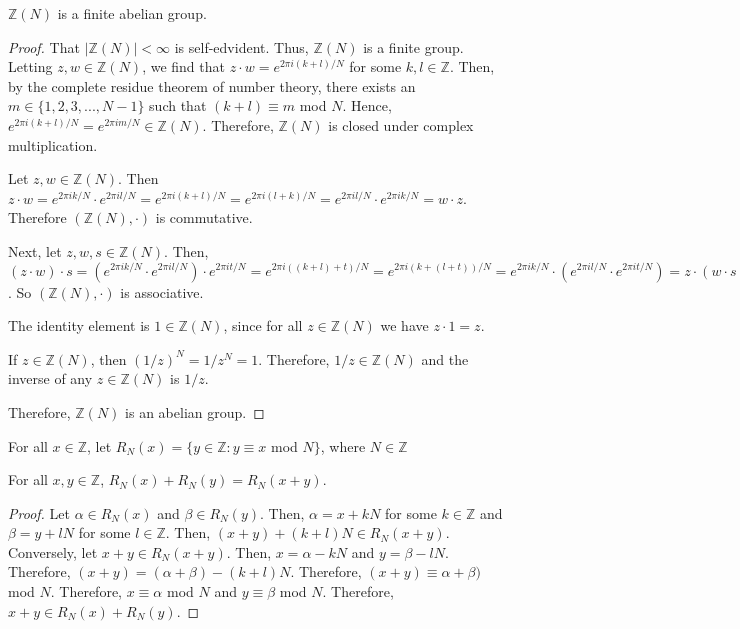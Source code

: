 \documentclass[../article.tex]{subfiles}
\begin{document}
\begin{theorem}
$\mathbb{Z}(N)$ is a finite abelian group.
\end{theorem}

\begin{proof}
That $| \mathbb{Z}(N)| < \infty$ is self-edvident. Thus, $\mathbb{Z}(N)$ is a finite group. Letting $z,w \in \mathbb{Z}(N)$, we find that $z \cdot w = e^{2 \pi i (k+l)/N}$ for some $k,l \in \mathbb{Z}$. Then, by the complete residue theorem of number theory, there exists an $m \in \{1, 2, 3, ..., N-1\}$ such that $(k+l) \equiv m$ mod $N$. Hence, $e^{2 \pi i (k+l)/N} = e^{2 \pi i m/N} \in \mathbb{Z}(N)$. Therefore, $\mathbb{Z}(N)$ is closed under complex multiplication.

Let $z,w \in \mathbb{Z}(N)$. Then $z \cdot w = e^{2 \pi i k/N} \cdot e^{2 \pi i l/N} = e^{2 \pi i (k+l)/N} = e^{2 \pi i (l+k)/N} = e^{2 \pi i l/N} \cdot e^{2 \pi i k/N} = w \cdot z$. Therefore $(\mathbb{Z}(N), \cdot)$ is commutative.

Next, let $z,w,s \in \mathbb{Z}(N)$. Then, $(z \cdot w) \cdot s = (e^{2 \pi i k/N} \cdot e^{2 \pi i l/N}) \cdot e^{2 \pi i t/N} = e^{2 \pi i ((k+l)+t)/N} = e^{2 \pi i (k+(l+t))/N} = e^{2 \pi i k/N} \cdot (e^{2 \pi i l/N} \cdot e^{2 \pi i t/N}) = z \cdot (w \cdot s)$. So $(\mathbb{Z}(N), \cdot)$ is associative.

The identity element is $1 \in \mathbb{Z}(N)$, since for all $z \in \mathbb{Z}(N)$ we have $z \cdot 1 = z$.

If $z \in \mathbb{Z}(N)$, then $(1/z)^N = 1/ z^N = 1$. Therefore, $1/z \in \mathbb{Z}(N)$ and the inverse of any $z \in \mathbb{Z}(N)$ is $1/z$.

Therefore, $\mathbb{Z}(N)$ is an abelian group.
\end{proof}

\begin{definition}
For all $x \in \mathbb{Z}$, let $R_N (x) = \{y \in \mathbb{Z} : y \equiv x  $ mod $  N\}$, where $N \in \mathbb{Z}$
\end{definition}
\begin{theorem}
For all $x,y \in \mathbb{Z}$, $R_N (x) + R_N (y) = R_N (x+y).$
\end{theorem}
\begin{proof}
Let $\alpha \in R_N (x)$ and $\beta \in R_N (y)$. Then, $\alpha = x +kN$ for some $k \in \mathbb{Z}$ and $\beta = y + lN$ for some $l \in \mathbb{Z}$. Then, $(x+y)+(k+l)N \in R_N (x+y)$. Conversely, let $x+y \in R_N (x+y)$. Then, $x = \alpha -kN$ and $y = \beta -lN$. Therefore, $(x+y) = (\alpha + \beta) -(k+l)N$. Therefore, $(x+y) \equiv \alpha +\beta)$ mod $N$. Therefore, $x \equiv \alpha$ mod $N$ and $y \equiv \beta$ mod $N$. Therefore, $x+y \in R_N (x) + R_N (y)$.
\end{proof}
\end{document}
